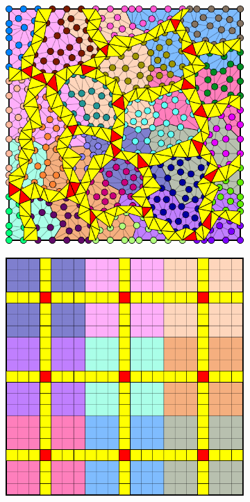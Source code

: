 \begin{figure}[htbp]
\begin{subfigure}[t]{0.3\textwidth}
  \end{subfigure}
  \hfill
  \begin{subfigure}[t]{0.3\textwidth}
    \centerline{\includegraphics[width=0.9\linewidth]{figs/square/square_tria_metis_cell_dual_nomerge}}
  \end{subfigure}
  \par\bigskip
  \begin{subfigure}[t]{0.3\textwidth}
    \centerline{\includegraphics[width=0.9\linewidth]{figs/square/square_cart_struct_cell_dual}}

\end{subfigure}
\end{figure}
